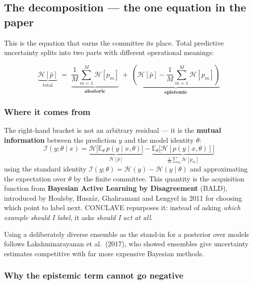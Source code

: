 \subsection{The decomposition --- the one equation in the paper}

This is the equation that earns the committee its place. Total predictive
uncertainty splits into two parts with different operational meanings:

\begin{equation}
\underbrace{\mathcal{H}[\bar p]}_{\text{total}}
\;=\;
\underbrace{\frac{1}{M}\sum_{m=1}^{M} \mathcal{H}[p_m]}_{\textbf{aleatoric}}
\;+\;
\underbrace{\left(\mathcal{H}[\bar p] - \frac{1}{M}\sum_{m=1}^{M}\mathcal{H}[p_m]\right)}_{\textbf{epistemic}}
\label{eq:bald}
\end{equation}

\subsubsection{Where it comes from}

The right-hand bracket is not an arbitrary residual --- it is the \textbf{mutual
information} between the prediction $y$ and the model identity $\theta$:
\begin{equation}
\mathcal{I}(y;\theta \mid x)
= \underbrace{\mathcal{H}\big[\mathbb{E}_{\theta}\, p(y\mid x,\theta)\big]}_{\mathcal{H}[\bar p]}
- \underbrace{\mathbb{E}_{\theta}\big[\mathcal{H}[p(y\mid x,\theta)]\big]}_{\frac1M\sum_m \mathcal{H}[p_m]}
\end{equation}
using the standard identity $\mathcal{I}(y;\theta) = \mathcal{H}(y) - \mathcal{H}(y\mid\theta)$
and approximating the expectation over $\theta$ by the finite committee. This
quantity is the acquisition function from \textbf{Bayesian Active Learning by
Disagreement} (BALD), introduced by Houlsby, Husz\'ar, Ghahramani and Lengyel in
2011 for choosing which point to label next. CONCLAVE repurposes it: instead of
asking \emph{which example should I label}, it asks \emph{should I act at all}.

Using a deliberately diverse ensemble as the stand-in for a posterior over
models follows Lakshminarayanan et al.\ (2017), who showed ensembles give
uncertainty estimates competitive with far more expensive Bayesian methods.

\subsubsection{Why the epistemic term cannot go negative}

